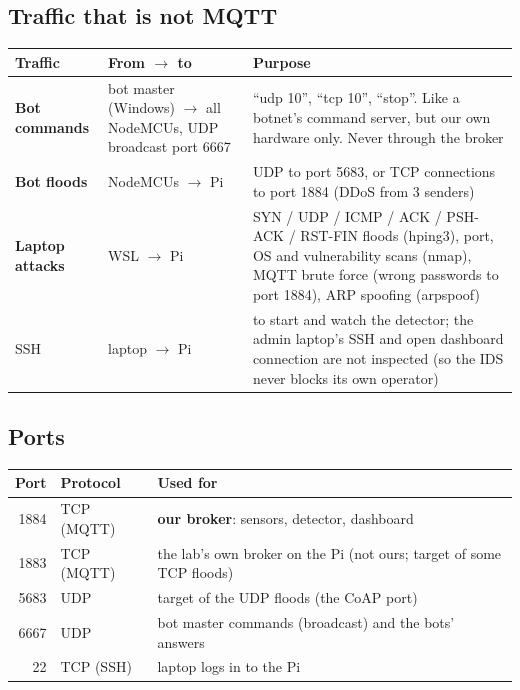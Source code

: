 \documentclass[11pt,a4paper]{article}
\newcommand{\tablestart}{\Needspace{8\baselineskip}}
\begin{document}
\subsection{Traffic that is not MQTT}

\tablestart
\begin{center}
\begin{tabularx}{\linewidth}{P{3.6cm}P{4.6cm}L}
\toprule
Traffic & From $\rightarrow$ to & Purpose \\
\midrule
\textcolor{cBot}{\textbf{Bot commands}} & bot master (Windows) $\rightarrow$ all NodeMCUs, UDP broadcast port 6667 &
``udp 10'', ``tcp 10'', ``stop''. Like a botnet's command server, but our own hardware only. Never through the
broker \\
\textcolor{cAttack}{\textbf{Bot floods}} & NodeMCUs $\rightarrow$ Pi & UDP to port 5683, or TCP connections to port
1884 (DDoS from 3 senders) \\
\textcolor{cAttack}{\textbf{Laptop attacks}} & WSL $\rightarrow$ Pi & SYN / UDP / ICMP / ACK / PSH-ACK / RST-FIN
floods (hping3), port, OS and vulnerability scans (nmap), MQTT brute force (wrong passwords to port 1884), ARP
spoofing (arpspoof) \\
SSH & laptop $\rightarrow$ Pi & to start and watch the detector; the admin laptop's SSH and open dashboard connection
are not inspected (so the IDS never blocks its own operator) \\
\bottomrule
\end{tabularx}
\end{center}

\subsection{Ports}

\tablestart
\begin{center}
\begin{tabular}{rll}
\toprule
Port & Protocol & Used for \\
\midrule
1884 & TCP (MQTT) & \textbf{our broker}: sensors, detector, dashboard \\
1883 & TCP (MQTT) & the lab's own broker on the Pi (not ours; target of some TCP floods) \\
5683 & UDP & target of the UDP floods (the CoAP port) \\
6667 & UDP & bot master commands (broadcast) and the bots' answers \\
22 & TCP (SSH) & laptop logs in to the Pi \\
\bottomrule
\end{tabular}
\end{center}
\end{document}
